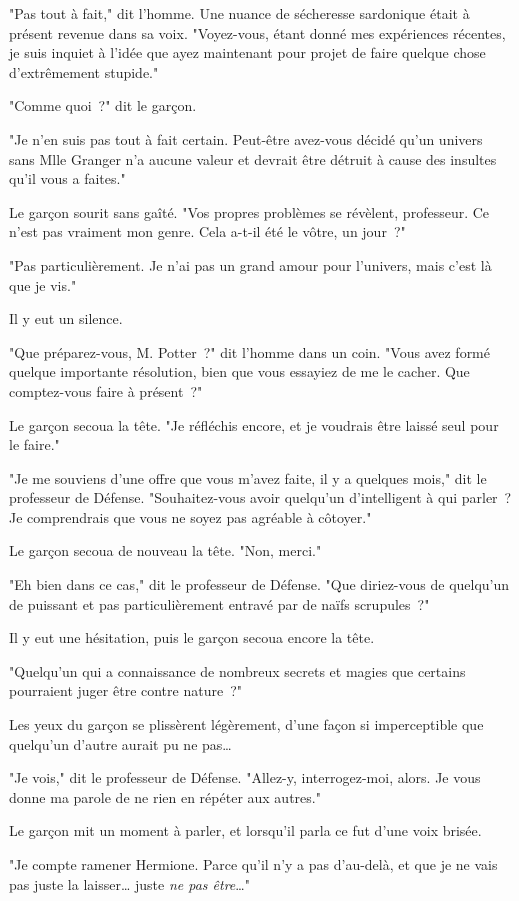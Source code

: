 "Pas tout à fait," dit l'homme. Une nuance de sécheresse sardonique était à présent revenue dans sa voix. "Voyez-vous, étant donné mes expériences récentes, je suis inquiet à l'idée que ayez maintenant pour projet de faire quelque chose d'extrêmement stupide."

"Comme quoi~?" dit le garçon.

"Je n'en suis pas tout à fait certain. Peut-être avez-vous décidé qu'un univers sans Mlle Granger n'a aucune valeur et devrait être détruit à cause des insultes qu'il vous a faites."

Le garçon sourit sans gaîté. "Vos propres problèmes se révèlent, professeur. Ce n'est pas vraiment mon genre. Cela a-t-il été le vôtre, un jour~?"

"Pas particulièrement. Je n'ai pas un grand amour pour l'univers, mais c'est là que je vis."

Il y eut un silence.

"Que préparez-vous, M. Potter~?" dit l'homme dans un coin. "Vous avez formé quelque importante résolution, bien que vous essayiez de me le cacher. Que comptez-vous faire à présent~?"

Le garçon secoua la tête. "Je réfléchis encore, et je voudrais être laissé seul pour le faire."

"Je me souviens d'une offre que vous m'avez faite, il y a quelques mois," dit le professeur de Défense. "Souhaitez-vous avoir quelqu'un d'intelligent à qui parler~? Je comprendrais que vous ne soyez pas agréable à côtoyer."

Le garçon secoua de nouveau la tête. "Non, merci."

"Eh bien dans ce cas," dit le professeur de Défense. "Que diriez-vous de quelqu'un de puissant et pas particulièrement entravé par de naïfs scrupules~?"

Il y eut une hésitation, puis le garçon secoua encore la tête.

"Quelqu'un qui a connaissance de nombreux secrets et magies que certains pourraient juger être contre nature~?"

Les yeux du garçon se plissèrent légèrement, d'une façon si imperceptible que quelqu'un d'autre aurait pu ne pas…

"Je vois," dit le professeur de Défense. "Allez-y, interrogez-moi, alors. Je vous donne ma parole de ne rien en répéter aux autres."

Le garçon mit un moment à parler, et lorsqu'il parla ce fut d'une voix brisée.

"Je compte ramener Hermione. Parce qu'il n'y a pas d'au-delà, et que je ne vais pas juste la laisser… juste \emph{ne pas être}…"

